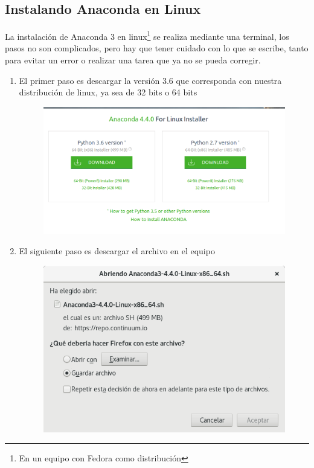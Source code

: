 \documentclass[12pt]{article}
\begin{document}
\subsection{Instalando Anaconda en Linux}
 La instalación de Anaconda 3 en linux\footnote{En un equipo con Fedora como distribución} se realiza mediante una terminal, los pasos no son complicados, pero hay que tener cuidado con lo que se escribe, tanto para evitar un error o realizar una tarea que ya no se pueda corregir.
\begin{enumerate}
\item El primer paso es descargar la versión 3.6 que corresponda con nuestra distribución de linux, ya sea de 32 bits o 64 bits
\begin{figure}[H]
	\centering
 	\includegraphics[scale=0.35]{Imagenes/Instalacion_Anaconda_01_linux_01} 
\end{figure}
\item El siguiente paso es descargar el archivo en el equipo
\begin{figure}[H]
 	\centering
 	\includegraphics[scale=0.35]{Imagenes/Instalacion_Anaconda_01_linux_02}

\end{figure}
\end{enumerate}
\end{document}
